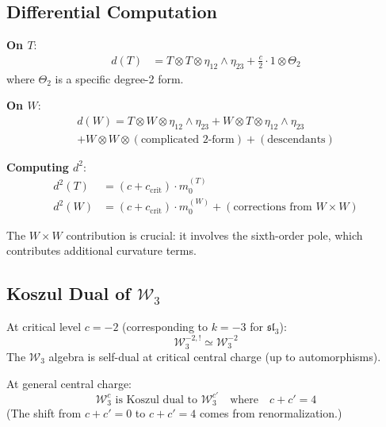 \subsection{Differential Computation}

\begin{computation}
\textbf{On $T$}:
\begin{align}
d(T) &= T \otimes T \otimes \eta_{12} \wedge \eta_{23} + \frac{c}{2} \cdot 1 \otimes \Theta_2
\end{align}
where $\Theta_2$ is a specific degree-2 form.

\textbf{On $W$}:
\begin{multline}
d(W) = T \otimes W \otimes \eta_{12} \wedge \eta_{23} + W \otimes T \otimes \eta_{12} \wedge \eta_{23} \\
+ W \otimes W \otimes (\text{complicated 2-form}) + (\text{descendants})
\end{multline}

\textbf{Computing $d^2$}:
\begin{align}
d^2(T) &= (c+c_{\text{crit}}) \cdot m_0^{(T)} \\
d^2(W) &= (c+c_{\text{crit}}) \cdot m_0^{(W)} + (\text{corrections from } W \times W)
\end{align}

The $W \times W$ contribution is crucial: it involves the sixth-order pole, which contributes additional curvature terms.
\end{computation}

\subsection{Koszul Dual of $\mathcal{W}_3$}

\begin{theorem}\label{thm:w3-koszul-dual}
At critical level $c = -2$ (corresponding to $k = -3$ for $\mathfrak{sl}_3$):
\begin{equation}
\mathcal{W}_3^{-2,!} \simeq \mathcal{W}_3^{-2}
\end{equation}
The $\mathcal{W}_3$ algebra is self-dual at critical central charge (up to automorphisms).

At general central charge:
\begin{equation}
\mathcal{W}_3^c \text{ is Koszul dual to } \mathcal{W}_3^{c'} \quad \text{where} \quad c + c' = 4
\end{equation}
(The shift from $c + c' = 0$ to $c + c' = 4$ comes from renormalization.)
\end{theorem}

